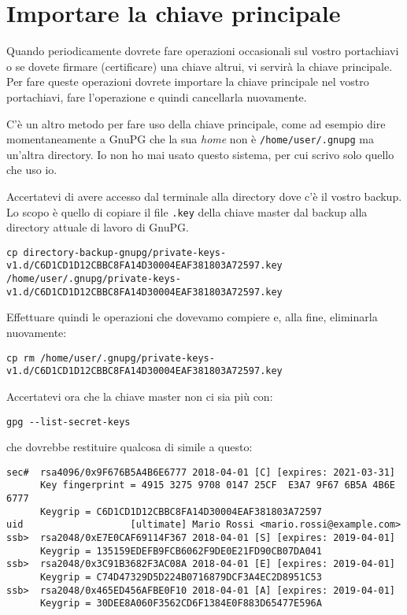 \section{Importare la chiave principale} \label{importare-chiave}

Quando periodicamente dovrete fare operazioni occasionali sul vostro portachiavi
o se dovete firmare (certificare) una chiave altrui, vi servirà la chiave
principale. Per fare queste operazioni dovrete importare la chiave principale
nel vostro portachiavi, fare l'operazione e quindi cancellarla nuovamente.

C'è un altro metodo per fare uso della chiave principale, come ad esempio dire
momentaneamente a GnuPG che la sua \emph{home} non è \texttt{/home/user/.gnupg}
ma un'altra directory. Io non ho mai usato questo sistema, per cui scrivo solo
quello che uso io.

Accertatevi di avere accesso dal terminale alla directory dove c'è il vostro
backup. Lo scopo è quello di copiare il file \texttt{.key} della chiave master
dal backup alla directory attuale di lavoro di GnuPG.

\begin{lstlisting}
cp directory-backup-gnupg/private-keys-v1.d/C6D1CD1D12CBBC8FA14D30004EAF381803A72597.key /home/user/.gnupg/private-keys-v1.d/C6D1CD1D12CBBC8FA14D30004EAF381803A72597.key
\end{lstlisting}

Effettuare quindi le operazioni che dovevamo compiere e, alla fine, eliminarla
nuovamente:

\begin{lstlisting}
cp rm /home/user/.gnupg/private-keys-v1.d/C6D1CD1D12CBBC8FA14D30004EAF381803A72597.key
\end{lstlisting}

Accertatevi ora che la chiave master non ci sia più con:

\begin{lstlisting}
gpg --list-secret-keys
\end{lstlisting}

che dovrebbe restituire qualcosa di simile a questo:

\begin{lstlisting}
sec#  rsa4096/0x9F676B5A4B6E6777 2018-04-01 [C] [expires: 2021-03-31]
      Key fingerprint = 4915 3275 9708 0147 25CF  E3A7 9F67 6B5A 4B6E 6777
      Keygrip = C6D1CD1D12CBBC8FA14D30004EAF381803A72597
uid                   [ultimate] Mario Rossi <mario.rossi@example.com>
ssb>  rsa2048/0xE7E0CAF69114F367 2018-04-01 [S] [expires: 2019-04-01]
      Keygrip = 135159EDEFB9FCB6062F9DE0E21FD90CB07DA041
ssb>  rsa2048/0x3C91B3682F3AC08A 2018-04-01 [E] [expires: 2019-04-01]
      Keygrip = C74D47329D5D224B0716879DCF3A4EC2D8951C53
ssb>  rsa2048/0x465ED456AFBE0F10 2018-04-01 [A] [expires: 2019-04-01]
      Keygrip = 30DEE8A060F3562CD6F1384E0F883D65477E596A
\end{lstlisting}

